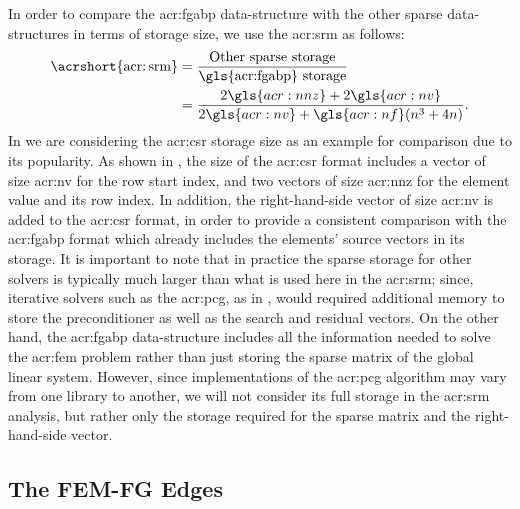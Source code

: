 In order to compare the \gls{acr:fgabp} data-structure with the other sparse data-structures in terms of storage size, we use the \gls{acr:srm} as follows:
\begin{align}
	\OpN{\acrshort{acr:srm}} & = \frac{\text{Other sparse storage}}{\text{\gls{acr:fgabp} storage}}\\
	& = \frac{2 \gls{acr:nnz} +2 \gls{acr:nv}}{2 \gls{acr:nv}+\gls{acr:nf}(n^3+4n)}. \label{eqn:srmCSR}
\end{align}
In  we are considering the \gls{acr:csr} storage size as an example for comparison due to its popularity.
As shown in , the size of the \gls{acr:csr} format includes a vector of size \gls{acr:nv} for the row start index, and two vectors of size \gls{acr:nnz} for the element value and its row index. 
In addition, the right-hand-side vector of size \gls{acr:nv} is added to the \gls{acr:csr} format, in order to provide a consistent comparison with the \gls{acr:fgabp} format which already includes the elements' source vectors in its storage.
It is important to note that in practice the sparse storage for other solvers is typically much larger than what is used here in the \gls{acr:srm}; since, iterative solvers such as the \gls{acr:pcg}, as in , would required additional memory to store the preconditioner as well as the search and residual vectors.
On the other hand, the \gls{acr:fgabp} data-structure includes all the information needed to solve the \gls{acr:fem} problem rather than just storing the sparse matrix of the global linear system.
However, since implementations of the \gls{acr:pcg} algorithm may vary from one library to another, we will not consider its full storage in the \gls{acr:srm} analysis, but rather only the storage required for the sparse matrix and the right-hand-side vector.

\subsection{The FEM-FG Edges}

